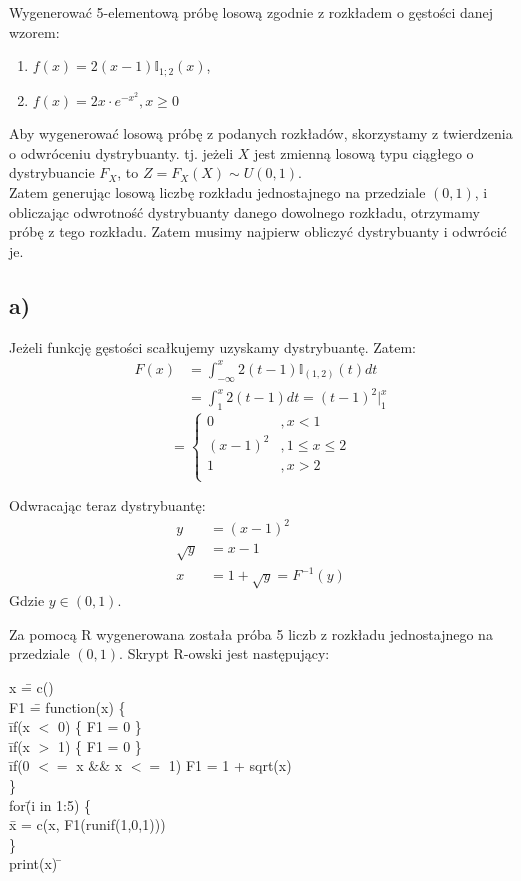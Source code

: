 \documentclass{article}
\begin{document}
{Wygenerować 5-elementową próbę losową zgodnie z rozkładem o gęstości danej
wzorem:
\begin{enumerate}[label = \alph*)]
\item $f(x) = 2(x-1)\mathbb{I}_{1;2}(x)$,
\item $f(x) = 2x \cdot e^{-x^2}, x\geq0$
\end{enumerate}

Aby wygenerować losową próbę z podanych rozkładów, skorzystamy z twierdzenia o odwróceniu dystrybuanty. tj. jeżeli $X$ jest zmienną losową typu ciągłego o dystrybuancie $F_X$, to $Z = F_X(X) \sim U(0,1)$. \\
Zatem generując losową liczbę rozkładu jednostajnego na przedziale $(0,1)$, i obliczając odwrotność dystrybuanty danego dowolnego rozkładu, otrzymamy próbę z tego rozkładu. Zatem musimy najpierw obliczyć dystrybuanty i odwrócić je.

\subsection{a)}
Jeżeli funkcję gęstości scałkujemy uzyskamy dystrybuantę. Zatem:
\begin{align*}
F(x) &= \int_{-\infty}^{x} 2(t-1) \mathbb{I}_{(1,2)}(t) dt \\
&= \int_{1}^{x} 2(t-1) dt = (t-1)^2 \Big\vert_{1}^{x}
\end{align*}
\[
= \left\{
\begin{array}{cc} 0 &, x < 1 \\ (x-1)^2 &, 1 \leq x \leq 2 \\ 1 &, x > 2 \\ \end{array}
\right.
\]

Odwracając teraz dystrybuantę:
\begin{align*}
y &= (x-1)^2 \\
\sqrt{y} &= x-1 \\
x &= 1 + \sqrt{y} = F^{-1}(y)
\end{align*}
Gdzie $y\in(0,1)$. \\
\par
Za pomocą R wygenerowana została próba 5 liczb z rozkładu jednostajnego na przedziale $(0,1)$. Skrypt R-owski jest następujący:
{\selectfont
\begin{tabbing}
x \= = c() \\
F1 \= = function(x) \{ \+ \\
	\= if(x $<$ 0) \{ F1 = 0 \} \\
	\= if(x $>$ 1) \{ F1 = 0 \} \\
	\= if(0 $<=$ x \&\& x $<=$ 1) { F1 = 1 + sqrt(x) } \- \\
\} \= \\
for\=(i in 1:5) \{ \+ \\
	\= x = c(x, F1(runif(1,0,1))) \- \\
\} \= \\
print(x) \=
\end{tabbing}
}

}
\end{document}
